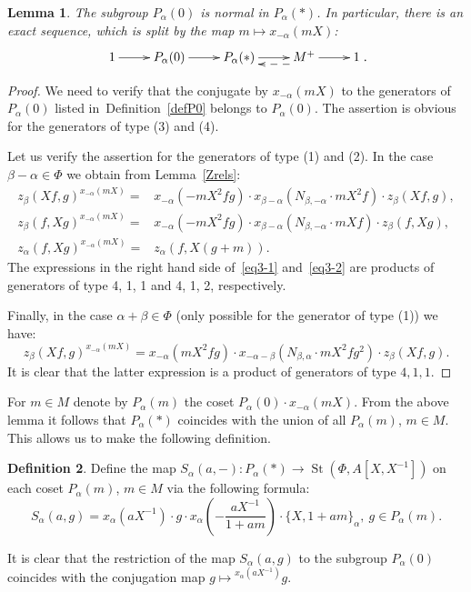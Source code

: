 \documentclass[oneside, 8pt]{amsart}
\newtheorem{lemma}{Lemma}
\theoremstyle{remark}
\theoremstyle{definition}
\newtheorem{df}[lemma]{Definition} \Crefname{df}{Definition}{Definitions}
\DeclareMathOperator{\St}{St}
\numberwithin{equation}{section}
\begin{document}
\begin{lemma}\label{P0_normal} The subgroup $P_\alpha(0)$ is normal in $P_\alpha(*)$. In particular, there is an exact sequence, which is split by the map $m \mapsto x_{-\alpha}(mX)$:
\[\xymatrix{1 \ar[r] & P_\alpha(0) \ar[r] & P_\alpha(*) \ar[r] & M^+ \ar@<5pt>@{-->}[l] \ar[r] & 1}.\]
\end{lemma}
\begin{proof} We need to verify that the conjugate by $x_{-\alpha}(mX)$ to the generators of $P_\alpha(0)$ listed in~Definition~\ref{defP0} belongs to $P_\alpha(0)$. The assertion is obvious for the generators of type (3) and (4).

Let us verify the assertion for the generators of type (1) and (2). In the case $\beta - \alpha \in \Phi$ we obtain from Lemma~\ref{Zrels}:
\begin{align} z_{\beta}(Xf, g) ^ {x_{-\alpha}(mX)} = & x_{-\alpha} (- mX^2fg) \cdot x_{\beta-\alpha} (N_{\beta, -\alpha}\cdot mX^2f)     \cdot z_{\beta}(Xf, g), \label{eq3-1} \\
  z_{\beta}(f, Xg) ^ {x_{-\alpha}(mX)} = & x_{-\alpha} (- mX^2fg ) \cdot x_{\beta-\alpha} (N_{\beta, -\alpha}\cdot mXf)     \cdot z_{\beta}(f, Xg), \label{eq3-2} \\
  z_{\alpha}(f, Xg) ^ {x_{-\alpha}(mX)} = & z_{\alpha}(f, X(g + m)). \end{align}
The expressions in the right hand side of~\eqref{eq3-1} and~\eqref{eq3-2} are products of generators of type 4, 1, 1 and 4, 1, 2, respectively.  

Finally, in the case $\alpha + \beta \in \Phi$ (only possible for the generator of type (1)) we have:
\[ z_{\beta}(Xf, g) ^ {x_{-\alpha}(mX)} = x_{-\alpha} (mX^2fg ) \cdot x_{-\alpha-\beta} (N_{\beta,\alpha}\cdot mX^2fg^2) \cdot z_{\beta}(Xf, g). \]
It is clear that the latter expression is a product of generators of type $4, 1, 1$.
\end{proof}

For $m \in M$ denote by $P_\alpha(m)$ the coset $P_\alpha(0) \cdot x_{-\alpha}(mX)$.
From the above lemma it follows that $P_\alpha(*)$ coincides with the union of all $P_\alpha(m)$, $m\in M$. This allows us to make the following definition. 

\begin{df}
Define the map $S_\alpha(a, -) \colon P_\alpha(*) \to \St(\Phi, A[X, X^{-1}])$ on each coset $P_\alpha(m)$, $m \in M$ via the following formula:
\[ S_\alpha(a, g) = x_\alpha(aX^{-1})\cdot g \cdot x_\alpha\left(-\frac{aX^{-1}}{1 + am}\right) \cdot \{X, 1+ am\}_\alpha,\ g \in P_\alpha(m).\] 
\end{df}
It is clear that the restriction of the map $S_\alpha(a, g)$ to the subgroup $P_\alpha(0)$ coincides with the conjugation map $g \mapsto {}^{x_\alpha(aX^{-1})}\!g$.
\end{document}
